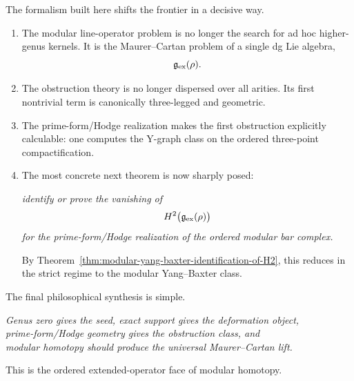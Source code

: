 The formalism built here shifts the frontier in a decisive way.

\begin{enumerate}
\item
The modular line-operator problem is no longer the search for ad hoc higher-genus kernels.
It is the Maurer--Cartan problem of a single dg Lie algebra,
\[
\mathfrak g_{\mathrm{ex}}(\rho).
\]

\item
The obstruction theory is no longer dispersed over all arities.
Its first nontrivial term is canonically three-legged and geometric.

\item
The prime-form/Hodge realization makes the first obstruction explicitly calculable:
one computes the Y-graph class on the ordered three-point compactification.

\item
The most concrete next theorem is now sharply posed:

\begin{center}
\emph{identify or prove the vanishing of }
\[
H^2\bigl(\mathfrak g_{\mathrm{ex}}(\rho)\bigr)
\]
\emph{for the prime-form/Hodge realization of the ordered modular bar complex.}
\end{center}

By Theorem~\ref{thm:modular-yang-baxter-identification-of-H2}, this reduces in the strict regime to
the modular Yang--Baxter class.
\end{enumerate}

\begin{remark}
The final philosophical synthesis is simple.

\begin{center}
\emph{Genus zero gives the seed, exact support gives the deformation object,}\\
\emph{prime-form/Hodge geometry gives the obstruction class, and}\\
\emph{modular homotopy should produce the universal Maurer--Cartan lift.}
\end{center}

This is the ordered extended-operator face of modular homotopy.
\end{remark}
